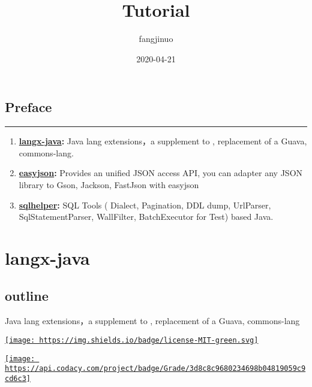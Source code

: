 \documentclass[
]{book}
\title{Tutorial}
\author{fangjinuo}
\date{2020-04-21}
\providecommand{\tightlist}{%
  \setlength{\itemsep}{0pt}\setlength{\parskip}{0pt}}
\begin{document}
\maketitle

{
\setcounter{tocdepth}{1}
\tableofcontents
}
\hypertarget{preface}{%
\chapter*{Preface}\label{preface}}

\begin{center}\rule{0.5\linewidth}{0.5pt}\end{center}

\begin{enumerate}
\def\labelenumi{\arabic{enumi}.}
\tightlist
\item
  \textbf{\href{https://github.com/fangjinuo/langx-java}{langx-java}: }Java lang extensions，a supplement to , replacement of a Guava, commons-lang.
\item
  \textbf{\href{https://github.com/fangjinuo/easyjson}{easyjson}: }Provides an unified JSON access API, you can adapter any JSON library to Gson, Jackson, FastJson with easyjson
\item
  \textbf{\href{https://github.com/fangjinuo/sqlhelper}{sqlhelper}: }SQL Tools ( Dialect, Pagination, DDL dump, UrlParser, SqlStatementParser, WallFilter, BatchExecutor for Test) based Java.
\end{enumerate}

\hypertarget{part-langx-java}{%
\part*{langx-java}\label{part-langx-java}}

\hypertarget{langx-java_outline}{%
\chapter{outline}\label{langx-java_outline}}

Java lang extensions，a supplement to , replacement of a Guava, commons-lang

\href{https://github.com/fangjinuo/langx-java/blob/master/LICENSE}{\texttt{[image: https://img.shields.io/badge/license-MIT-green.svg]}}

\href{https://www.codacy.com/manual/fs1194361820/langx-java?utm_source=github.com\&utm_medium=referral\&utm_content=fangjinuo/langx-java\&utm_campaign=Badge_Grade}{\texttt{[image: https://api.codacy.com/project/badge/Grade/3d8c8c9680234698b04819059c9cd6c3]}}
\end{document}
